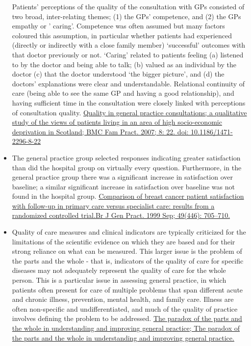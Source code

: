\documentclass[]{book}
\begin{document}
\begin{itemize}
  Patients' perceptions of the quality of the consultation with GPs consisted of two broad, inter-relating themes; (1) the GPs' competence, and (2) the GPs empathy or ' caring'. Competence was often assumed but many factors coloured this assumption, in particular whether patients had experienced (directly or indirectly with a close family member) `successful' outcomes with that doctor previously or not. `Caring' related to patients feeling (a) listened to by the doctor and being able to talk; (b) valued as an individual by the doctor (c) that the doctor understood `the bigger picture', and (d) the doctors' explanations were clear and understandable. Relational continuity of care (being able to see the same GP and having a good relationship), and having sufficient time in the consultation were closely linked with perceptions of consultation quality. \href{https://www.ncbi.nlm.nih.gov/pmc/articles/PMC1857696/}{Quality in general practice consultations; a qualitative study of the views of patients living in an area of high socio-economic deprivation in Scotland; BMC Fam Pract. 2007; 8: 22. doi: 10.1186/1471-2296-8-22}
\item
  The general practice group selected responses indicating greater satisfaction than did the hospital group on virtually every question. Furthermore, in the general practice group there was a significant increase in satisfaction over baseline; a similar significant increase in satisfaction over baseline was not found in the hospital group. \href{https://www.ncbi.nlm.nih.gov/pmc/articles/PMC1313497/}{Comparison of breast cancer patient satisfaction with follow-up in primary care versus specialist care: results from a randomized controlled trial.Br J Gen Pract. 1999 Sep; 49(446): 705--710.}
\item
  Quality of care measures and clinical indicators are typically criticized for the limitations of the scientific evidence on which they are based and for their strong reliance on what can be measured. This larger issue is the problem of the parts and the whole - that is, indicators of the quality of care for specific diseases may not adequately represent the quality of care for the whole person. This is a particular issue in assessing general practice, in which patients often present for care of multiple problems that span different acute and chronic illness, prevention, mental health, and family care. Illness are often non-specific and undifferentiated, and much of the quality of practice involves defining the problem to be addressed. \href{https://sci-hub.tw/10.1093/intqhc/14.4.267}{The paradox of the parts and the whole in understanding and improving general practice; The paradox of the parts and the whole in understanding and improving general practice.}

\end{itemize}
\end{document}
